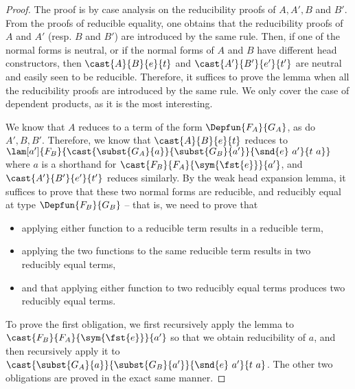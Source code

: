 \begin{proof}
The proof is by case analysis on the reducibility proofs of \( A, A', B \) and \( B' \).
%
From the proofs of reducible equality, one obtains that the reducibility proofs of \( A \) and
\( A' \) (resp. \( B \) and \( B' \)) are introduced by the same rule. Then, if one of the
normal forms is neutral, or if the normal forms of \( A \) and \( B \) have different head
constructors, then \( \cast{A}{B}{e}{t} \) and \( \cast{A'}{B'}{e'}{t'} \) are neutral and easily
seen to be reducible.
%
Therefore, it suffices to prove the lemma when all the reducibility proofs are introduced by the
same rule. We only cover the case of dependent products, as it is the most interesting.

We know that \( A \) reduces to a term of the form \( \Depfun{F_A}{G_A} \), as do \( A', B, B' \).
Therefore, we know that \( \cast{A}{B}{e}{t} \) reduces to
\( \lam[a']{F_B}{\cast{\subst{G_A}{a}}{\subst{G_B}{a'}}{\snd{e}\ a'}{t\ a}} \) where \( a \) is
a shorthand for \( \cast{F_B}{F_A}{\sym{\fst{e}}}{a'} \), and \( \cast{A'}{B'}{e'}{t'} \) reduces
similarly. By the weak head expansion lemma, it suffices to prove that these two normal forms are
reducible, and reducibly equal at type \( \Depfun{F_B}{G_B} \) -- that is, we need to prove that
\begin{itemize}
\item applying either function to a reducible term results in a reducible term,
\item applying the two functions to the same reducible term results in two reducibly equal terms,  
\item and that applying either function to two reducibly equal terms produces two reducibly equal terms.
\end{itemize}

To prove the first obligation, we first recursively apply the lemma to
\( \cast{F_B}{F_A}{\sym{\fst{e}}}{a'} \) so that we obtain reducibility of \( a \), and then
recursively apply it to \( \cast{\subst{G_A}{a}}{\subst{G_B}{a'}}{\snd{e}\ a'}{t\ a} \).
The other two obligations are proved in the exact same manner.
\end{proof}

